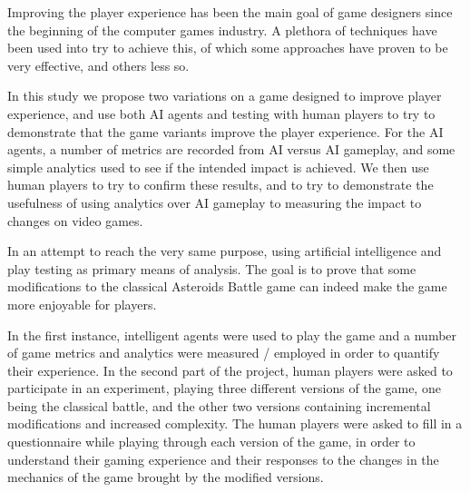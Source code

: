 Improving the player experience has been the main goal of game designers since the beginning of the computer games industry. A plethora of techniques have been used into try to achieve this, of which some approaches  have proven to be very effective, and others less so.

In this study we propose two variations on a game designed to improve player experience, and use both AI agents and testing with human players to try to demonstrate that the game variants improve the player experience. For the AI agents, a number of metrics are recorded from AI versus AI gameplay, and some simple analytics used to see if the intended impact is achieved. We then use human players to try to confirm these results, and to try to demonstrate the usefulness of using analytics over AI gameplay to measuring the impact to changes on video games.

In an attempt to reach the very same purpose, using artificial intelligence and play testing as primary means of analysis. The goal is to prove that some modifications to the classical Asteroids Battle game can indeed make the game more enjoyable for players.

In the first instance, intelligent agents were used to play the game and a number of game metrics and analytics were measured / employed in order to quantify their experience. In the second part of the project, human players were asked to participate in an experiment, playing three different versions of the game, one being the classical battle, and the other two versions containing incremental modifications and increased complexity. The human players were asked to fill in a questionnaire while playing through each version of the game, in order to understand their gaming experience and their responses to the changes in the mechanics of the game brought by the modified versions.
